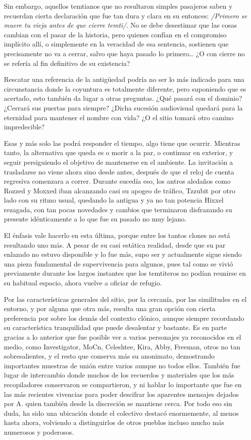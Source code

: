 \documentclass[
]{book}
\begin{document}
Sin embargo, aquellos temtianos que no resultaron simples pasajeros saben y recuerdan cierta declaración que fue tan dura y clara en su entonces: \emph{/Primero se muere tu vieja antes de que cierre temti/}. No se debe desestimar que las cosas cambian con el pasar de la historia, pero quienes confían en el compromiso implícito allí, o simplemente en la veracidad de esa sentencia, sostienen que precisamente no va a cerrar, salvo que haya pasado lo primero\ldots{} ¿O con cierre no se refería al fin definitivo de su existencia?

Rescatar una referencia de la antigüedad podría no ser lo más indicado para una circunstancia donde la coyuntura es totalmente diferente, pero suponiendo que es acertado, esto también da lugar a otras preguntas. ¿Qué pasará con el dominio? ¿Cerrará sus puertas para siempre? ¿Dicha sucesión audiovisual quedará para la eternidad para mantener el nombre con vida? ¿O el sitio tomará otro camino impredecible?

Esas y más solo las podrá responder el tiempo, algo tiene que ocurrir. Mientras tanto, la alternativa que queda es o morir a la par, o continuar en exterior, y seguir persiguiendo el objetivo de mantenerse en el ambiente. La invitación a trasladarse no viene ahora sino desde antes, después de que el reloj de cuenta regresiva comenzara a correr. Durante sucedía eso, los antros aledaños como Rozzed y Moxxed iban alcanzando casi su apogeo de tráfico, Tzzubit por otro lado con su ritmo usual, quedando la antigua y ya no tan potencia Hixxel rezagada, con tan pocas novedades y cambios que terminaron disfrazando su presente idénticamente a lo que fue su pasado no muy lejano.

El énfasis vale hacerlo en esta última, porque entre los tantos clones no está resultando uno más. A pesar de su casi estática realidad, desde que su par enlazado no estuvo disponible y lo fue más, supo ser y actualmente sigue siendo una pieza fundamental de supervivencia para algunos, pues tal como se vivió previamente durante los largos instantes que los temtiteros no podían reunirse en su habitual espacio, ahora vuelve a oficiar de refugio.

Por las características generales del sitio, por la cercanía, por las similitudes en el entorno, y por alguna que otra más, resulta una gran opción con cierta preferencia por sobre los demás del contexto clónico, aunque siempre recordando su característica tranquilidad que puede desalentar y bastante. Es en parte gracias a lo anterior que fue posible ver a varios personajes ya reconocidos en el medio, como Investigator, MoCn, Celeshtee, Kira, Abby, Freeman, otros no tan sobresalientes, y el resto que conserva más su anonimato, demostrando importantes muestras de unión entre varios aunque no todos ellos. También fue lugar de intercambio donde muchos de los recuerdos y materiales que los más recopiladores conservaron se compartieron, y ni hablar lo importante que fue en las más recientes vivencias para poder descifrar los aparentes mensajes dejados por A. quien también desde la discreción se mantiene cerca. Por todo eso sin duda, ha sido una ubicación donde el colectivo destacó enormemente, al menos hasta ahora, volviendo a distinguirlos de otros pueblos incluso mucho más numerosos y poderosos.
\end{document}
